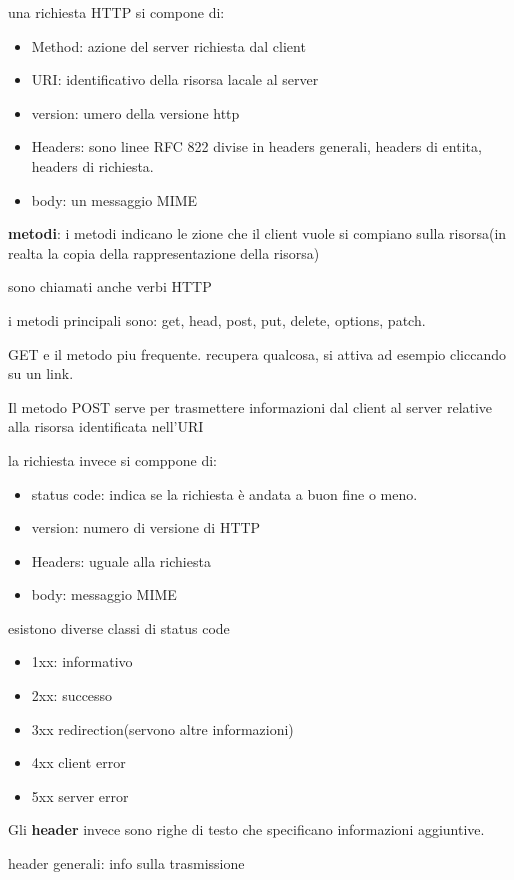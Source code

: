 \documentclass[12pt]{article}
\begin{document}
una richiesta HTTP si compone di:
\begin{itemize}
\item Method: azione del server richiesta dal client
\item URI: identificativo della risorsa lacale al server
\item version: umero della versione http
\item Headers: sono linee RFC 822 divise in headers generali, headers di entita, headers di richiesta.
\item body: un messaggio MIME
\end{itemize}

\textbf{metodi}: i metodi indicano le zione che il client vuole si compiano sulla risorsa(in realta la copia della rappresentazione della risorsa)

sono chiamati anche verbi HTTP

i metodi principali sono: get, head, post, put, delete, options, patch.

GET e il metodo piu frequente. recupera qualcosa, si attiva ad esempio cliccando su un link.

Il metodo POST serve per trasmettere informazioni dal
client al server relative alla risorsa identificata nell'URI

la richiesta invece si comppone di:
\begin{itemize}
\item status code: indica se la richiesta è andata a buon fine o meno.
\item version: numero di versione di HTTP
\item Headers: uguale alla richiesta
\item body: messaggio MIME
\end{itemize}

esistono diverse classi di status code

\begin{itemize}
\item 1xx: informativo
\item 2xx: successo
\item 3xx redirection(servono altre informazioni)
\item 4xx client error
\item 5xx server error
\end{itemize}

Gli \textbf{header} invece sono righe di testo che specificano informazioni aggiuntive.

header generali: info sulla trasmissione
\end{document}
